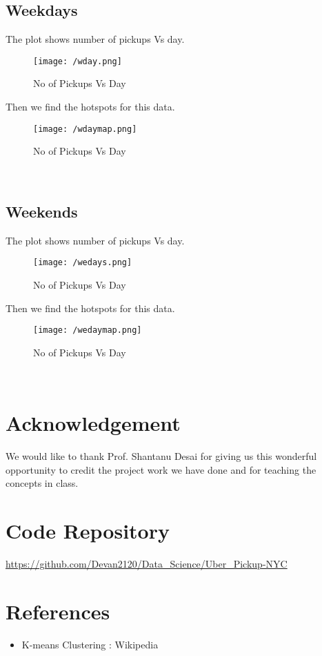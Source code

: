 \documentclass[fleqn]{report}
\begin{document}
  	\subsection{Weekdays}
  	The plot shows number of pickups Vs day.
  	 \begin{figure}[!ht]
  		\centering
  		\texttt{[image: /wday.png]}
  		\caption{No of Pickups Vs Day}
  		\label{fig:wday}
  	\end{figure} 
  	Then we find the hotspots for this data.
  	  	 \begin{figure}[!ht]
  		\centering
  		\texttt{[image: /wdaymap.png]}
  		\caption{No of Pickups Vs Day}
  		\label{fig:wdaymap}
  	\end{figure}\\ 
  	  	\subsection{Weekends}
  	The plot shows number of pickups Vs day.
  	\begin{figure}[!ht]
  		\centering
  		\texttt{[image: /wedays.png]}
  		\caption{No of Pickups Vs Day}
  		\label{fig:weday}
  	\end{figure} 
  	Then we find the hotspots for this data.
  	\begin{figure}[!ht]
  		\centering
  		\texttt{[image: /wedaymap.png]}
  		\caption{No of Pickups Vs Day}
  		\label{fig:wedaymap}
  	\end{figure} \\
	\section{Acknowledgement}
	We would like to thank Prof. Shantanu Desai for giving us this wonderful opportunity to credit the
	project work we have done and for teaching the concepts in class.
	\section{Code Repository}
	\url{https://github.com/Devan2120/Data_Science/Uber_Pickup-NYC}
	\section{References}
	\begin{itemize}
		\item K-means Clustering : Wikipedia 
	\end{itemize}
	 

	
\end{document}
